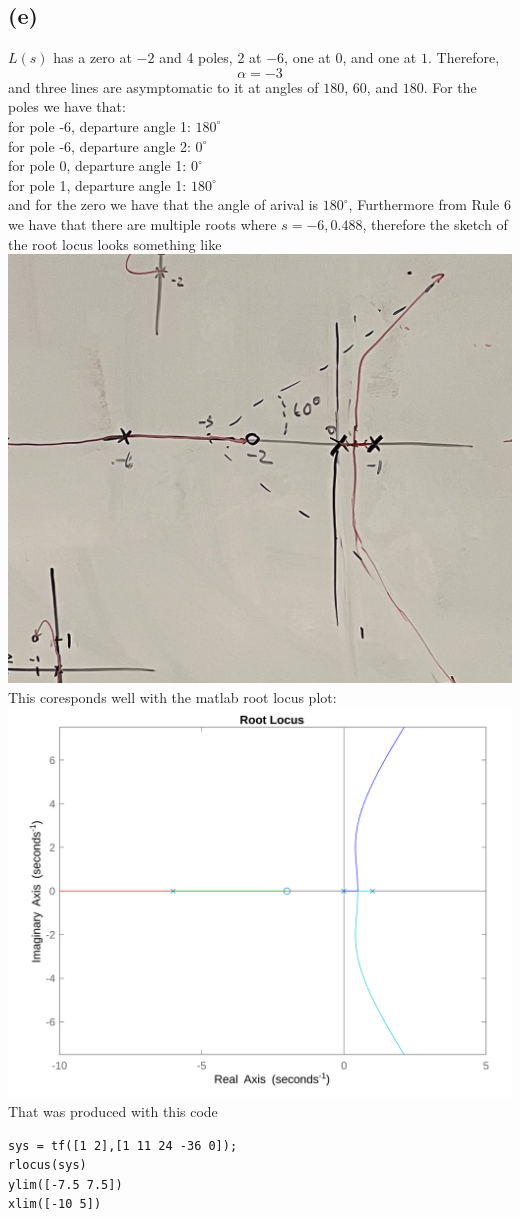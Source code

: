 \documentclass[12pt]{article}
\begin{document}
\subsection*{(e)}
$L(s)$ has a zero at $-2$ and 4 poles, 2 at $-6$, one at $0$, and one at $1$. Therefore,
$$\alpha=-3$$
and three lines are asymptomatic to it at angles of $180$, $60$, and $180$.
For the poles we have that:\\
for pole -6, departure angle 1: $180^{\circ}$
\\for pole -6, departure angle 2: $0^{\circ}$
\\for pole 0, departure angle 1: $0^{\circ}$
\\for pole 1, departure angle 1: $180^{\circ}$
\\and for the zero we have that the angle of arival is $180^{\circ}$,
Furthermore from Rule 6 we have that there are multiple roots where $s=-6,0.488$, therefore the sketch of the root locus looks something like
\\\includegraphics[scale=.15]{Problem3Sketch1.jpg}
\\This coresponds well with the matlab root locus plot:\\
\includegraphics[scale=.2]{Problem3Matlab1.png}
\\That was produced with this code
\begin{verbatim}
sys = tf([1 2],[1 11 24 -36 0]);
rlocus(sys)
ylim([-7.5 7.5])
xlim([-10 5])
\end{verbatim}
\end{document}

